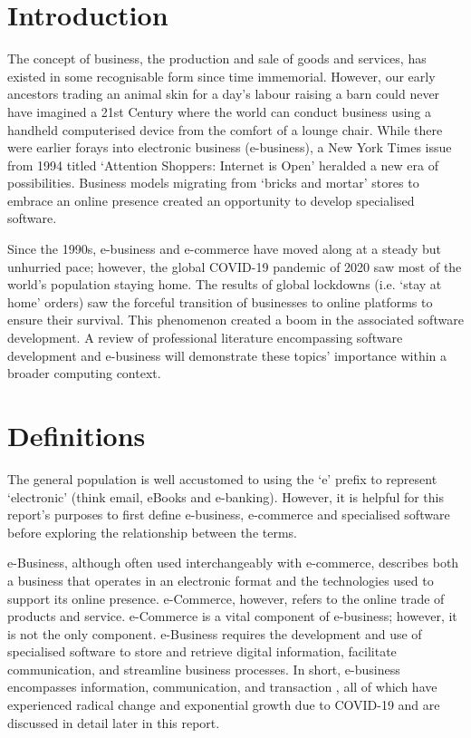 \documentclass[12pt]{article}
\begin{document}
\section{Introduction}
The concept of business, the production and sale of goods and services, has existed in some recognisable form since time immemorial. However, our early ancestors trading an animal skin for a day’s labour raising a barn could never have imagined a 21st Century where the world can conduct business using a handheld computerised device from the comfort of a lounge chair. While there were earlier forays into electronic business (e-business), a New York Times issue from 1994 titled ‘Attention Shoppers: Internet is Open’ \cite{lewis} heralded a new era of possibilities. Business models migrating from ‘bricks and mortar’ stores to embrace an online presence created an opportunity to develop specialised software. \par 

Since the 1990s, e-business and e-commerce have moved along at a steady but unhurried pace; however, the global COVID-19 pandemic of 2020 saw most of the world’s population staying home. The results of global lockdowns (i.e. ‘stay at home’ orders) saw the forceful transition of businesses to online platforms to ensure their survival. This phenomenon created a boom in the associated software development. A review of professional literature encompassing software development and e-business will demonstrate these topics’ importance within a broader computing context. \par

\section{Definitions}
The general population is well accustomed to using the ‘e’ prefix to represent ‘electronic’ (think email, eBooks and e-banking). However, it is helpful for this report’s purposes to first define e-business, e-commerce and specialised software before exploring the relationship between the terms.

e-Business, although often used interchangeably with e-commerce, describes both a business that operates in an electronic format and the technologies used to support its online presence. e-Commerce, however, refers to the online trade of products and service. e-Commerce is a vital component of e-business; however, it is not the only component. e-Business requires the development and use of specialised software to store and retrieve digital information, facilitate communication, and streamline business processes. In short, e-business encompasses information, communication, and transaction \cite{ionos}, all of which have experienced radical change and exponential growth due to COVID-19 and are discussed in detail later in this report.
\end{document}
